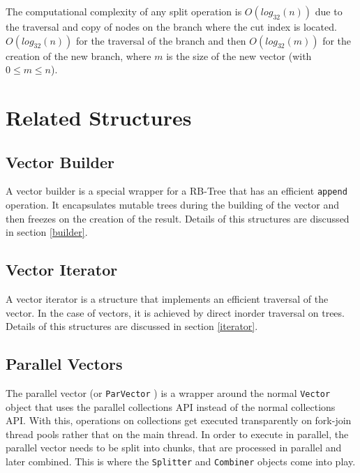 The computational complexity of any split operation is $O(log_{32}(n))$ due to the traversal and copy of nodes on the branch where the cut index is located. $O(log_{32}(n))$ for the traversal of the branch and then $O(log_{32}(m))$ for the creation of the new branch, where $m$ is the size of the new vector (with $0\leq m \leq n$).



\section{Related Structures}
\label{RelatedStructures}

\subsection{Vector Builder}
A vector builder is a special wrapper for a RB-Tree that has an efficient \texttt{append} operation. It encapsulates mutable trees during the building of the vector and then freezes on the creation of the result. Details of this structures are discussed in section \ref{builder}.

\subsection{Vector Iterator}
A vector iterator is a structure that implements an efficient traversal of the vector. In the case of vectors, it is achieved by direct inorder traversal on trees. Details of this structures are discussed in section \ref{iterator}.

\subsection{Parallel Vectors}
The parallel vector (or \texttt{ParVector} \cite{scalaParVector211}) is a wrapper around the normal \texttt{Vector} object that uses the parallel collections API instead of the normal collections API. With this, operations on collections get executed transparently on fork-join thread pools rather that on the main thread. In order to execute in parallel, the parallel vector needs to be split into chunks, that are processed in parallel and later combined. This is where the \texttt{Splitter} and \texttt{Combiner} objects come into play.


